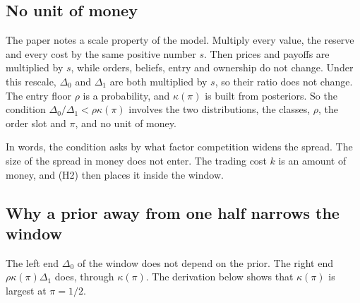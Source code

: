 \subsection{No unit of money}

The paper notes a scale property of the model. Multiply every value, the reserve and every cost by the same
positive number \(s\). Then prices and payoffs are multiplied by \(s\), while orders, beliefs, entry and ownership do
not change. Under this rescale, \(\Delta_0\) and \(\Delta_1\) are both multiplied by \(s\), so their ratio does not
change. The entry floor \(\rho\) is a probability, and \(\kappa(\pi)\) is built from posteriors. So the condition
\(\Delta_0/\Delta_1<\rho\kappa(\pi)\) involves the two distributions, the classes, \(\rho\), the order slot and
\(\pi\), and no unit of money.

In words, the condition asks by what factor competition widens the spread. The size of the spread in money does
not enter. The trading cost \(k\) is an amount of money, and (H2) then places it inside the window.

\subsection{Why a prior away from one half narrows the window}

The left end \(\Delta_0\) of the window does not depend on the prior. The right end \(\rho\kappa(\pi)\Delta_1\) does,
through \(\kappa(\pi)\). The derivation below shows that \(\kappa(\pi)\) is largest at \(\pi=1/2\).

